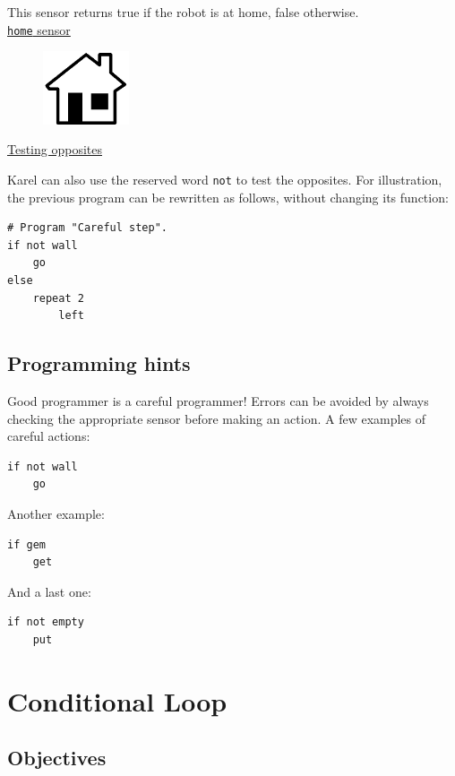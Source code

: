 This sensor returns true if the robot is at home, false otherwise.\\
\noindent
\underline{{\tt home} sensor}
\begin{figure}[!ht]
\begin{center}
\includegraphics[width=2.55cm]{imgk/a31.png}
\end{center}
\end{figure}

\noindent
\underline{Testing opposites}

Karel can also use the reserved word {\tt not} to test the opposites.
For illustration, the previous program can be rewritten as follows, without 
changing its function:
\begin{verbatim}
# Program "Careful step".
if not wall
    go
else
    repeat 2
        left
\end{verbatim}

\subsection{Programming hints}

Good programmer is a careful programmer! Errors can be avoided by always checking the 
appropriate sensor before making an action. A few examples of careful actions:
 
\begin{verbatim}
if not wall
    go
\end{verbatim}
Another example:
 
\begin{verbatim}
if gem
    get
\end{verbatim}
And a last one:
 
\begin{verbatim}
if not empty
    put
\end{verbatim}


\section{Conditional Loop} \label{sec:whilek}

\subsection{Objectives} 
 
